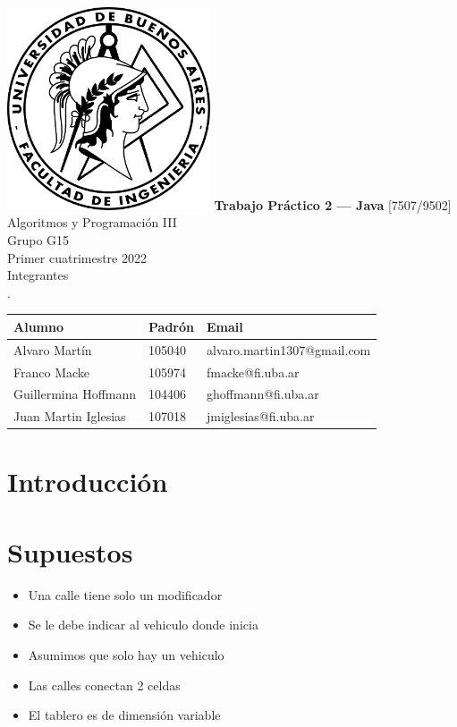 \documentclass[titlepage,a4paper]{article}
\begin{document}
\begin{titlepage} %
	\hfill\includegraphics[width=6cm]{logofiuba.jpg}
    \centering
    \vfill
    \Huge \textbf{Trabajo Práctico 2 — Java}
    \vskip2cm
    \Large [7507/9502] Algoritmos y Programación III\\
    Grupo G15 \\
    Primer cuatrimestre 2022 \\
    \vfill
    Integrantes \\
    .\\
    \begin{tabular}{ | l | l | l | } %
      \hline
      Alumno & Padrón & Email \\ \hline
      Alvaro Martín & 105040 & alvaro.martin1307@gmail.com \\ \hline
      Franco Macke & 105974 & fmacke@fi.uba.ar \\ \hline
      Guillermina Hoffmann & 104406 & ghoffmann@fi.uba.ar \\ \hline
      Juan Martin Iglesias & 107018 & jmiglesias@fi.uba.ar \\ \hline
  	\end{tabular}
    \vfill
    \vfill
\end{titlepage}

\tableofcontents %
\newpage

\section{Introducción}\label{sec:intro}

\section{Supuestos}\label{sec:supuestos}
  \begin{itemize}
    \item Una calle tiene solo un modificador
    \item Se le debe indicar al vehiculo donde inicia
    \item Asumimos que solo hay un vehiculo
    \item Las calles conectan 2 celdas
    \item El tablero es de dimensión variable
  \end{itemize}
\end{document}
